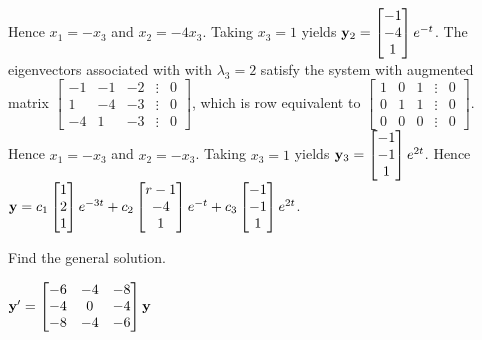 \documentclass{ximera}
\begin{document}
\begin{problem}
\begin{solution}
Hence $x_1=-x_3$ and $x_2=-4x_3$.  Taking $x_3=1$ yields
${\bf y}_2=  \begin{bmatrix}-1\\-4\\ 1
 \end{bmatrix}e^{-t}$.
The eigenvectors associated with
 with $\lambda_3=2$ satisfy the system with  augmented matrix
$  \begin{bmatrix}-1&-1&-2&\vdots&0\\1&
-4&-3&\vdots&0\\-4&1&-3&\vdots&0
 \end{bmatrix}$,
which is row equivalent to
$  \begin{bmatrix}1&0&1&\vdots&0\\0&1&1&
\vdots&0\\0&0&0&\vdots&0 \end{bmatrix}$.
Hence $x_1=-x_3$ and $x_2=-x_3$.  Taking $x_3=1$ yields
${\bf y}_3=  \begin{bmatrix}-1\\-1\\1
 \end{bmatrix}e^{2t}$. Hence
 ${\bf y}= c_1 \begin{bmatrix} 1\\2\\1
 \end{bmatrix}e^{-3t}+c_2 \begin{bmatrix}{r}-1\\-4\\1 \end{bmatrix}e^{-t}+c_3 \begin{bmatrix}-1\\-1\\1 \end{bmatrix}e^{2t}$.
\end{solution}
\end{problem}


\begin{problem}\label{exer:10.4.9}
Find the general solution.

$ {\bf y}'=
\begin{bmatrix}
-6&-4&-8\\-4&0&-4\\-8&-4&-6\end{bmatrix}{\bf y}$
\end{problem}
\end{document}
